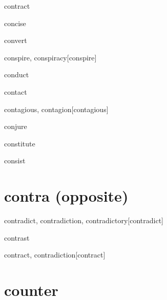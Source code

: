 \begin{RefWord}{contract}
\end{RefWord}

\begin{RefWord}{concise}
\end{RefWord}

\begin{RefWord}{convert}
\end{RefWord}

\begin{RefWord}{conspire, conspiracy}[conspire]
\end{RefWord}

\begin{RefWord}{conduct}
\end{RefWord}

\begin{RefWord}{contact}
\end{RefWord}

\begin{RefWord}{contagious, contagion}[contagious]
\end{RefWord}

\begin{RefWord}{conjure}
\end{RefWord}

\begin{RefWord}{constitute}
\end{RefWord}

\begin{RefWord}{consist}
\end{RefWord}



\section{contra (opposite)}

\begin{RefWord}{contradict, contradiction, contradictory}[contradict]
\end{RefWord}

\begin{RefWord}{contrast}
\end{RefWord}

\begin{DefWord}{contract, contradiction}[contract]
\end{DefWord}

\section{counter}


